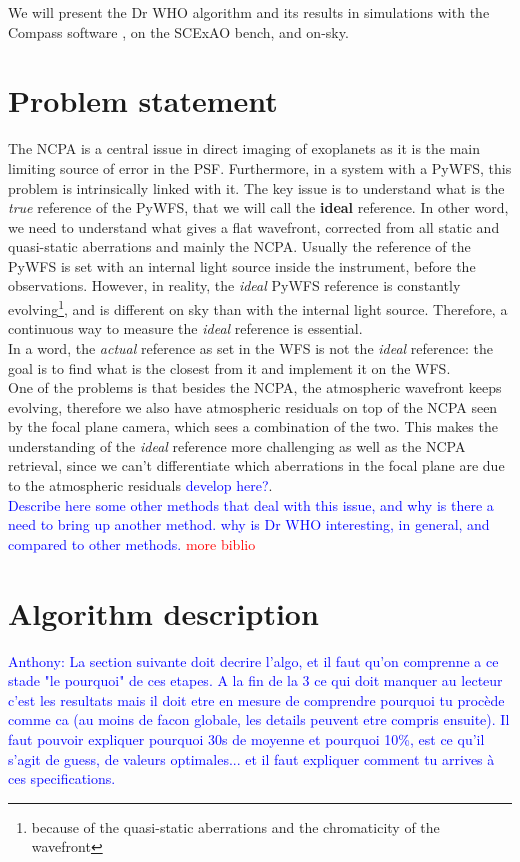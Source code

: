 \documentclass[twocolumn]{aastex62}
\begin{document}
We will present the Dr WHO algorithm and its results in simulations with the Compass software \citep{Compass}, on the SCExAO bench, and on-sky.\\


\section{Problem statement}
The NCPA is a central issue in direct imaging of exoplanets as it is the main limiting source of error in the PSF. Furthermore, in a system with a PyWFS, this problem is intrinsically linked with it. The key issue is to understand what is the \textit{true} reference of the PyWFS, that we will call the \textbf{ideal} reference. In other word, we need to understand what gives a flat wavefront, corrected from all static and quasi-static aberrations and mainly the NCPA. 
Usually the reference of the PyWFS is set with an internal light source inside the instrument, before the observations. However, in reality, the \textit{ideal} PyWFS reference is constantly evolving\footnote{because of the quasi-static aberrations and the chromaticity of the wavefront}, and is different on sky than with the internal light source. Therefore, a continuous way to measure the \textit{ideal} reference is essential. \\
In a word, the \textit{actual} reference as set in the WFS is not the \textit{ideal} reference: the goal is to find what is the closest from it and implement it on the WFS.\\

One of the problems is that besides the NCPA, the atmospheric wavefront keeps evolving, therefore we also have atmospheric residuals on top of the NCPA seen by the focal plane camera, which sees a combination of the two. This makes the understanding of the \textit{ideal} reference more challenging as well as the NCPA retrieval, since we can't differentiate which aberrations in the focal plane are due to the atmospheric residuals \textcolor{blue}{develop here?}. \\

\textcolor{blue}{Describe here some other methods that deal with this issue, and why is there a need to bring up another method. why is Dr WHO interesting, in general, and compared to other methods.}
\textcolor{red}{more biblio}


\section{Algorithm description}
\textcolor{blue}{Anthony: La section suivante doit decrire l'algo, et il faut qu'on comprenne a ce stade "le pourquoi" de ces etapes. A la fin de la 3 ce qui doit manquer au lecteur c'est les resultats mais il doit etre en mesure de comprendre pourquoi tu procède comme ca (au moins de facon globale, les details peuvent etre compris ensuite). Il faut pouvoir expliquer pourquoi 30s de moyenne et pourquoi 10\%, est ce qu'il s'agit de guess, de valeurs optimales... et il faut expliquer comment tu arrives à ces specifications.\\}
\end{document}
